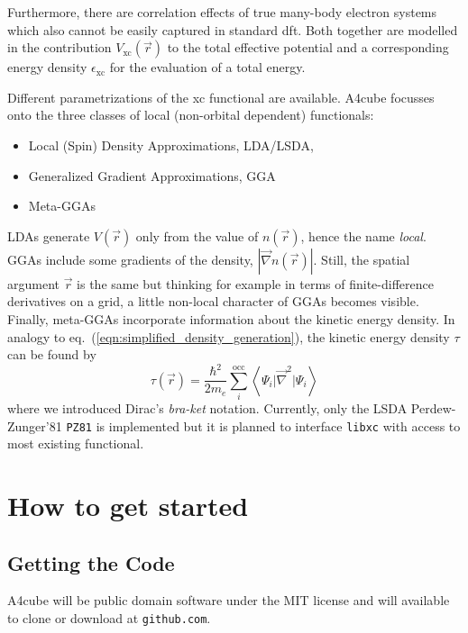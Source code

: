 \documentclass[oribibl]{llncs}
\newcommand{\um}[1]{_{\mathrm{#1}}}
\newcommand{\ttt}[1]{\texttt{#1}}
\newcommand{\braketop}[3]{\left\langle \left. #1 \right| #2 \left| #3 \right. \right\rangle}
\newcommand{\codename}{A4cube}
\begin{document}
Furthermore, there are correlation effects of true many-body electron systems
which also cannot be easily captured in standard \ac{dft}.
Both together are modelled in the contribution $V\um{xc}(\vec r)$ 
to the total effective potential and a corresponding energy density $\epsilon\um{xc}$ for the evaluation of a total energy.

Different parametrizations of the \ac{xc} functional are available.
\codename{} focusses onto the three classes of local (non-orbital dependent) functionals: 
\begin{itemize}
	\item Local (Spin) Density Approximations, LDA/LSDA, 
	\item Generalized Gradient Approximations, GGA
	\item Meta-GGAs
\end{itemize}
LDAs generate $V(\vec r)$ only from the value of $n(\vec r)$, 
hence the name \emph{local}. 
GGAs include some gradients of the density, $|\vec \nabla n(\vec r)|$.
Still, the spatial argument $\vec r$ is the same but thinking for example
in terms of finite-difference derivatives on a grid, 
a little non-local character of GGAs becomes visible.
Finally, meta-GGAs incorporate information about the kinetic energy density.
In analogy to eq.~(\ref{eqn:simplified_density_generation}), the kinetic energy density $\tau$ can be found by
\begin{equation}
	\tau(\vec r) = \frac{\hbar^2}{2m_e} \sum_i^{\mathrm{occ}} \braketop{ \Psi_i } {\vec \nabla^2 } { \Psi_i } 
	\label{eqn:simplified_kinetic_energy_density_generation}
\end{equation}
where we introduced Dirac's \emph{bra-ket} notation.
Currently, only the LSDA Perdew-Zunger'81 \ttt{PZ81} is implemented 
but it is planned to interface \ttt{libxc} with access to most existing functional.



\section{How to get started}

\subsection{Getting the Code}
\codename{} will be public domain software under the MIT license
and will available to clone or download at \ttt{github.com}. 
\end{document}

